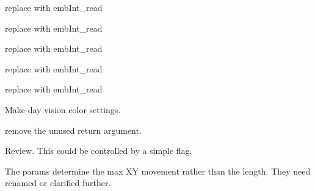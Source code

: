 
\begin{DoxyRefList}
\item[Member \mbox{\hyperlink{formats_8c_ad608ccee7fa2036aeba8500061ea0824}{binary\+Write\+Int\+BE}} (FILE $\ast$f, int data)]\label{todo__todo000220}%
%
replace with emb\+Int\+\_\+read  
\item[Member \mbox{\hyperlink{formats_8c_ab2256826c6ea8d2374fc94df46a7616f}{binary\+Write\+Short}} (FILE $\ast$f, short data)]\label{todo__todo000216}%
%
replace with emb\+Int\+\_\+read  
\item[Member \mbox{\hyperlink{formats_8c_a152fc4262fce475f30786312da68fad6}{binary\+Write\+UInt\+BE}} (FILE $\ast$f, unsigned int data)]\label{todo__todo000222}%
%
replace with emb\+Int\+\_\+read  
\item[Member \mbox{\hyperlink{formats_8c_a760e806c16c1612a6b5ca5a26bc736d1}{binary\+Write\+UShort}} (FILE $\ast$f, unsigned short data)]\label{todo__todo000217}%
%
replace with emb\+Int\+\_\+read  
\item[Member \mbox{\hyperlink{formats_8c_ac93ea02c7dfc79fb81e7e7cc5acea14a}{binary\+Write\+UShort\+BE}} (FILE $\ast$f, unsigned short data)]\label{todo__todo000218}%
%
replace with emb\+Int\+\_\+read  
\item[Member \mbox{\hyperlink{mainwindow_8cpp_aa6383a35d84ac737c2960d6e4f858a38}{day\+\_\+vision\+\_\+action}} (String args)]\label{todo__todo000007}%
%
Make day vision color settings.  
\item[Member \mbox{\hyperlink{encoding_8c_a9a4ef6979894437de607ac59967d6691}{decode\+\_\+t01\+\_\+record}} (unsigned char b\mbox{[}3\mbox{]}, int $\ast$x, int $\ast$y, int $\ast$flags)]\label{todo__todo000207}%
%
remove the unused return argument.  
\item[Member \mbox{\hyperlink{geometry_8c_ae6461f57f08ce5992c70fa9897988644}{emb\+Geometry\+\_\+vulcanize}} (Emb\+Geometry $\ast$obj)]\label{todo__todo000223}%
%
Review. This could be controlled by a simple flag.  
\item[Member \mbox{\hyperlink{pattern_8c_a6d1fde93564a15d1ec24399fc613d1ac}{emb\+Pattern\+\_\+correct\+For\+Max\+Stitch\+Length}} (Emb\+Pattern $\ast$p, Emb\+Real max\+Stitch\+Length, Emb\+Real max\+Jump\+Length)]\label{todo__todo000226}%
%
The params determine the max XY movement rather than the length. They need renamed or clarified further.  

\end{DoxyRefList}
